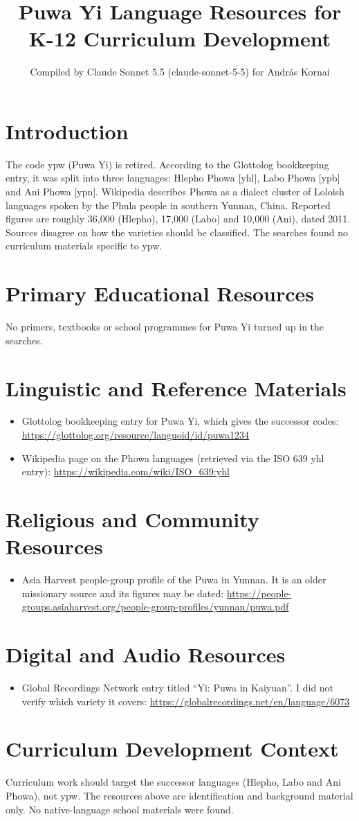 \documentclass[12pt]{article}
\title{Puwa Yi Language Resources for K-12 Curriculum Development}
\author{Compiled by Claude Sonnet 5.5 (claude-sonnet-5-5) for Andr\'as Kornai}
\date{}
\begin{document}
\maketitle

\section{Introduction}
The code ypw (Puwa Yi) is retired. According to the Glottolog bookkeeping entry, it was split into three languages: Hlepho Phowa [yhl], Labo Phowa [ypb] and Ani Phowa [ypn]. Wikipedia describes Phowa as a dialect cluster of Loloish languages spoken by the Phula people in southern Yunnan, China. Reported figures are roughly 36,000 (Hlepho), 17,000 (Labo) and 10,000 (Ani), dated 2011. Sources disagree on how the varieties should be classified. The searches found no curriculum materials specific to ypw.

\section{Primary Educational Resources}
No primers, textbooks or school programmes for Puwa Yi turned up in the searches.

\section{Linguistic and Reference Materials}
\begin{itemize}
\item Glottolog bookkeeping entry for Puwa Yi, which gives the successor codes: \url{https://glottolog.org/resource/languoid/id/puwa1234}
\item Wikipedia page on the Phowa languages (retrieved via the ISO 639 yhl entry): \url{https://wikipedia.com/wiki/ISO_639:yhl}
\end{itemize}

\section{Religious and Community Resources}
\begin{itemize}
\item Asia Harvest people-group profile of the Puwa in Yunnan. It is an older missionary source and its figures may be dated: \url{https://people-groups.asiaharvest.org/people-group-profiles/yunnan/puwa.pdf}
\end{itemize}

\section{Digital and Audio Resources}
\begin{itemize}
\item Global Recordings Network entry titled ``Yi: Puwa in Kaiyuan''. I did not verify which variety it covers: \url{https://globalrecordings.net/en/language/6073}
\end{itemize}

\section{Curriculum Development Context}
Curriculum work should target the successor languages (Hlepho, Labo and Ani Phowa), not ypw. The resources above are identification and background material only. No native-language school materials were found.
\end{document}
